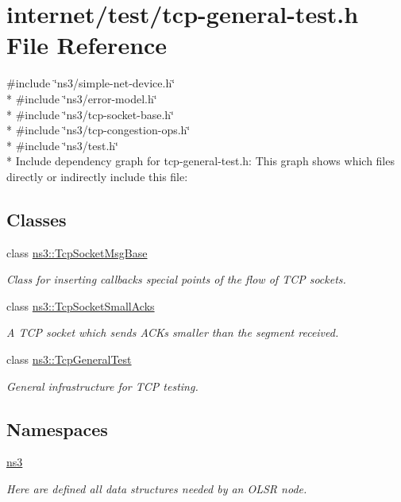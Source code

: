 \hypertarget{tcp-general-test_8h}{}\section{internet/test/tcp-\/general-\/test.h File Reference}
\label{tcp-general-test_8h}
{\ttfamily \#include \char`\"{}ns3/simple-\/net-\/device.\+h\char`\"{}}\\*
{\ttfamily \#include \char`\"{}ns3/error-\/model.\+h\char`\"{}}\\*
{\ttfamily \#include \char`\"{}ns3/tcp-\/socket-\/base.\+h\char`\"{}}\\*
{\ttfamily \#include \char`\"{}ns3/tcp-\/congestion-\/ops.\+h\char`\"{}}\\*
{\ttfamily \#include \char`\"{}ns3/test.\+h\char`\"{}}\\*
Include dependency graph for tcp-\/general-\/test.h\+:
This graph shows which files directly or indirectly include this file\+:
\subsection*{Classes}
\begin{DoxyCompactItemize}
\item 
class \hyperlink{classns3_1_1TcpSocketMsgBase}{ns3\+::\+Tcp\+Socket\+Msg\+Base}
\begin{DoxyCompactList}\small\item\em Class for inserting callbacks special points of the flow of T\+CP sockets. \end{DoxyCompactList}\item 
class \hyperlink{classns3_1_1TcpSocketSmallAcks}{ns3\+::\+Tcp\+Socket\+Small\+Acks}
\begin{DoxyCompactList}\small\item\em A T\+CP socket which sends A\+C\+Ks smaller than the segment received. \end{DoxyCompactList}\item 
class \hyperlink{classns3_1_1TcpGeneralTest}{ns3\+::\+Tcp\+General\+Test}
\begin{DoxyCompactList}\small\item\em General infrastructure for T\+CP testing. \end{DoxyCompactList}\end{DoxyCompactItemize}
\subsection*{Namespaces}
\begin{DoxyCompactItemize}
\item 
 \hyperlink{namespacens3}{ns3}
\begin{DoxyCompactList}\small\item\em Here are defined all data structures needed by an O\+L\+SR node. \end{DoxyCompactList}\end{DoxyCompactItemize}
